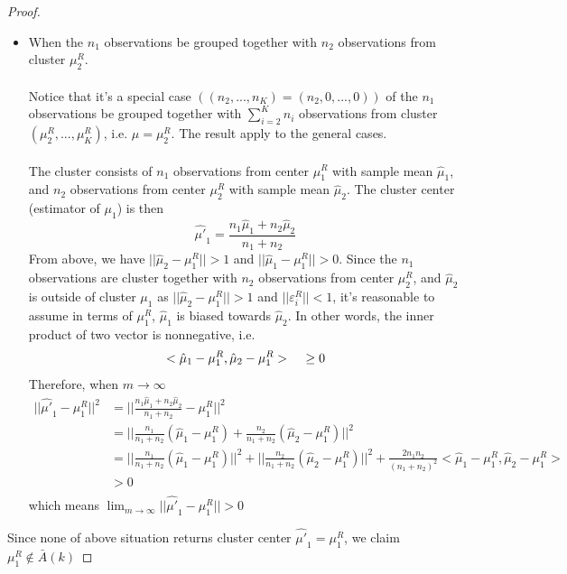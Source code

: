 \documentclass[11pt]{article}
\begin{document}
\begin{proof}
\begin{itemize}
	\item When the $n_1$ observations be grouped together with $n_2$ observations from cluster $\mu^R_2$. \\\\
	Notice that it's a special case $\left(\left(n_2,...,n_{K}\right) = (n_2,0,...,0)\right)$ of the $n_1$ observations be grouped together with $\sum^{K}_{i=2}n_i$ observations from cluster $(\mu^R_2,...,\mu^R_{K})$, i.e. $\mu = \mu^R_2$. The result apply to the general cases.\\\\
	The cluster consists of $n_1$ observations from center $\mu^R_1$ with sample mean $\hat{\mu}_1$, and $n_2$ observations from center $\mu^R_2$ with sample mean $\hat{\mu}_2$. The cluster center (estimator of $\mu_1$) is then 
	\[\hat{\mu'}_1 = \frac{n_1\hat{\mu}_1+n_2\hat{\mu}_2}{n_1+n_2} \]
From above, we have $||\hat{\mu}_2-\mu^R_1|| > 1$ and $||\hat{\mu}_1-\mu^R_1|| > 0$. Since the $n_1$ observations are cluster together with $n_2$ observations from center $\mu^R_2$, and $\hat{\mu}_2$ is outside of cluster $\mu_1$ as $||\hat{\mu}_2-\mu^R_1|| > 1$ and $||\varepsilon^R_i||<1$, it's reasonable to assume in terms of $\mu^R_1$, $\hat{\mu}_1$ is biased towards $\hat{\mu}_2$. In other words, the inner product of two vector is nonnegative, i.e.
\[ <\hat{\mu}_1-\mu^R_1,\hat{\mu}_2-\mu^R_1>\hspace{0.2in} \geq 0 \] 
Therefore, when $m\to \infty$
\begin{align}
	||\hat{\mu'}_1 - \mu^R_1||^2&= || \frac{n_1\hat{\mu}_1+n_2\hat{\mu}_2}{n_1+n_2} - \mu^R_1||^2  \nonumber \\ \nonumber
	&=||\frac{n_1}{n_1+n_2}(\hat{\mu}_1-\mu^R_1)+\frac{n_2}{n_1+n_2}(\hat{\mu}_2-\mu^R_1)||^2  \\ \nonumber
	&= ||\frac{n_1}{n_1+n_2}(\hat{\mu}_1-\mu^R_1)||^2+ ||\frac{n_2}{n_1+n_2}(\hat{\mu}_2-\mu^R_1)||^2+\frac{2n_1n_2}{(n_1+n_2)^2} <\hat{\mu}_1-\mu^R_1,\hat{\mu}_2-\mu^R_1>\\ \nonumber
	&>0  \\ \nonumber
\end{align}
which means \hspace{1in} $\lim_{m\to\infty}||\hat{\mu'}_1-\mu^R_1|| > 0$
\end{itemize}
Since none of above situation returns cluster center $\hat{\mu'}_1 = \mu^R_1$, we claim $\mu^R_1 \notin \bar{A}(k)$
\end{proof}
\end{document}
